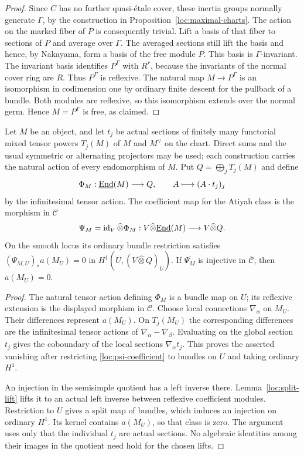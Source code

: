 \begin{proof}
Since $C$ has no further quasi-\'etale cover, these inertia groups
normally generate $\Gamma$, by the construction in
Proposition~\ref{loc:maximal-charts}.  The action on the marked
fiber of $P$ is consequently trivial.  Lift a basis of that fiber
to sections of $P$ and average over $\Gamma$.  The averaged
sections still lift the basis and hence, by Nakayama, form a basis
of the free module $P$.  This basis is $\Gamma$-invariant.
The invariant basis identifies $P^\Gamma$ with $R^r$, because the
invariants of the normal cover ring are $R$.  Thus $P^\Gamma$ is
reflexive.  The natural map $M\to P^\Gamma$ is an isomorphism in
codimension one by ordinary finite descent for the pullback of a
bundle.  Both modules are reflexive, so this isomorphism extends over
the normal germ.  Hence $M=P^\Gamma$ is free, as claimed.
\end{proof}

\begin{lemma}
\label{loc:atiyah-tests}
Let $M$ be an object, and let $t_j$ be actual sections of finitely
many functorial mixed tensor powers $T_j(M)$ of $M$ and $M^\vee$ on
the chart.  Direct sums and the usual symmetric or alternating
projectors may be used; each construction carries the natural action
of every endomorphism of $M$.  Put $Q=\bigoplus_jT_j(M)$ and define
\[
 \Phi_M:\underline{\operatorname{End}}(M)\longrightarrow Q,
       \qquad A\longmapsto(A\cdot t_j)_j
\]
by the infinitesimal tensor action.  The coefficient map for the
Atiyah class is the morphism in $\mathcal C$
\begin{equation}\label{loc:psi-coefficient}
 \Psi_M=\operatorname{id}_V\widehat\otimes\Phi_M:
 V\widehat\otimes\underline{\operatorname{End}}(M)
       \longrightarrow V\widehat\otimes Q.
\end{equation}
On the smooth locus its ordinary bundle restriction satisfies
$(\Psi_{M,U})_*a(M_U)=0$ in $H^1(U,(V\widehat\otimes Q)_U)$.
If $\overline{\Psi_M}$ is injective in $\overline{\mathcal C}$, then
$a(M_U)=0$.
\end{lemma}

\begin{proof}
The natural tensor action defining $\Phi_M$ is a bundle map on $U$;
its reflexive extension is the displayed morphism in $\mathcal C$.
Choose local connections $\nabla_\alpha$ on $M_U$.
Their differences represent $a(M_U)$.  On $T_j(M_U)$ the
corresponding differences are the infinitesimal tensor actions of
$\nabla_\alpha-\nabla_\beta$.  Evaluating on the global section
$t_j$ gives the coboundary of the local sections
$\nabla_\alpha t_j$.  This proves the asserted vanishing after
restricting \eqref{loc:psi-coefficient} to bundles on $U$ and taking
ordinary $H^1$.

An injection in the semisimple quotient has a left inverse there.
Lemma~\ref{loc:split-lift} lifts it to an actual left inverse
between reflexive coefficient modules.  Restriction to $U$ gives
a split map of bundles, which induces an injection on ordinary
$H^1$.  Its kernel contains $a(M_U)$, so that class is zero.
The argument uses only that the individual $t_j$ are actual
sections.  No algebraic identities among their images in the
quotient need hold for the chosen lifts.
\end{proof}

